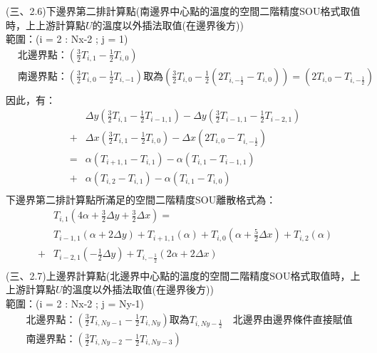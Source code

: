 \documentclass[12pt]{article}
\begin{document}
\noindent (三、2.6)下邊界第二排計算點(南邊界中心點的溫度的空間二階精度SOU格式取值時，上上游計算點$U$的溫度以外插法取值(在邊界後方))\\
\noindent 範圍：(i = 2 : Nx-2 ; j = 1)\\
\begin{equation}
  \begin{split}
    &\mbox{北邊界點：}(\frac{3}{2}T_{i,1}-\frac{1}{2}T_{i,0})\\
    &\mbox{南邊界點：}(\frac{3}{2}T_{i,0}-\frac{1}{2}T_{i,-1})\mbox{取為}(\frac{3}{2}T_{i,0}-\frac{1}{2}(2T_{i,-\frac{1}{2}}-T_{i,0})) = (2T_{i,0} - T_{i,-\frac{1}{2}})\\
  \end{split}
\end{equation}
\noindent 因此，有：
\begin{equation}
\begin{split}
  &\Delta y(\frac{3}{2}T_{i,1} - \frac{1}{2}T_{i-1,1}) - \Delta y(\frac{3}{2}T_{i-1,1} - \frac{1}{2}T_{i-2,1})\\
  + &\Delta x (\frac{3}{2}T_{i,1}-\frac{1}{2}T_{i,0})- \Delta x (2T_{i,0} - T_{i,-\frac{1}{2}}) \\
  = &\alpha (T_{i+1,1} -T_{i,1} ) - \alpha(T_{i,1} -T_{i-1,1}) \\
  + & \alpha (T_{i,2} -T_{i,1}) - \alpha(T_{i,1}-T_{i,0}) \\
\end{split}
\end{equation}
\noindent 下邊界第二排計算點所滿足的空間二階精度SOU離散格式為：
\begin{equation}
  \begin{split}
    &T_{i,1}(4\alpha+\frac{3}{2} \Delta y + \frac{3}{2}\Delta x)=\\
    &T_{i-1,1}(\alpha+2\Delta y) + T_{i+1,1}(\alpha) + T_{i,0}(\alpha+\frac{5}{2}\Delta x) + T_{i,2}(\alpha)\\
    + &T_{i-2,1}(-\frac{1}{2}\Delta y) + T_{i,-\frac{1}{2}}(2\alpha+2\Delta x)\\
  \end{split}
\end{equation}
(三、2.7)上邊界計算點(北邊界中心點的溫度的空間二階精度SOU格式取值時，上上游計算點$U$的溫度以外插法取值(在邊界後方))\\
\noindent 範圍：(i = 2 : Nx-2 ; j = Ny-1)\\
\begin{equation}
  \begin{split}
    &\mbox{北邊界點：}(\frac{3}{2}T_{i,Ny-1}-\frac{1}{2}T_{i,Ny})\mbox{取為}T_{i,Ny-\frac{1}{2}}\quad \mbox{北邊界由邊界條件直接賦值}\\
    &\mbox{南邊界點：}(\frac{3}{2}T_{i,Ny-2}-\frac{1}{2}T_{i,Ny-3})\\
  \end{split}
\end{equation}
\end{document}
